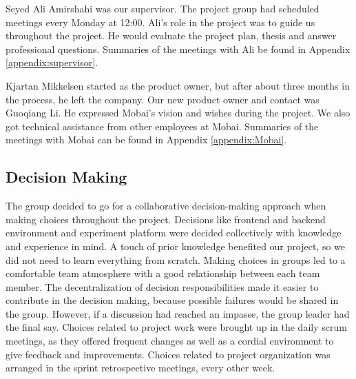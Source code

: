 Seyed Ali Amirshahi was our supervisor. The project group had scheduled meetings every Monday at 12:00. Ali's role in the project was to guide us throughout the project. He would evaluate the project plan, thesis and answer professional questions. Summaries of the meetings with Ali be found in Appendix \ref{appendix:supervisor}.

Kjartan Mikkelsen started as the product owner, but after about three months in the process, he left the company. Our new product owner and contact was Guoqiang Li. He expressed Mobai's vision and wishes during the project. We also got technical assistance from other employees at Mobai. Summaries of the meetings with Mobai can be found in Appendix \ref{appendix:Mobai}.

\subsection{Decision Making}
The group decided to go for a collaborative decision-making \cite{GroupDecisionMaking} approach when making choices throughout the project. Decisions like frontend and backend environment and experiment platform were decided collectively with knowledge and experience in mind. A touch of prior knowledge benefited our project, so we did not need to learn everything from scratch. Making choices in groups led to a comfortable team atmosphere with a good relationship between each team member. The decentralization of decision responsibilities made it easier to contribute in the decision making, because possible failures would be shared in the group. However, if a discussion had reached an impasse, the group leader had the final say. Choices related to project work were brought up in the daily scrum meetings, as they offered frequent changes as well as a cordial environment to give feedback and improvements. Choices related to project organization was arranged in the sprint retrospective meetings, every other week. 


